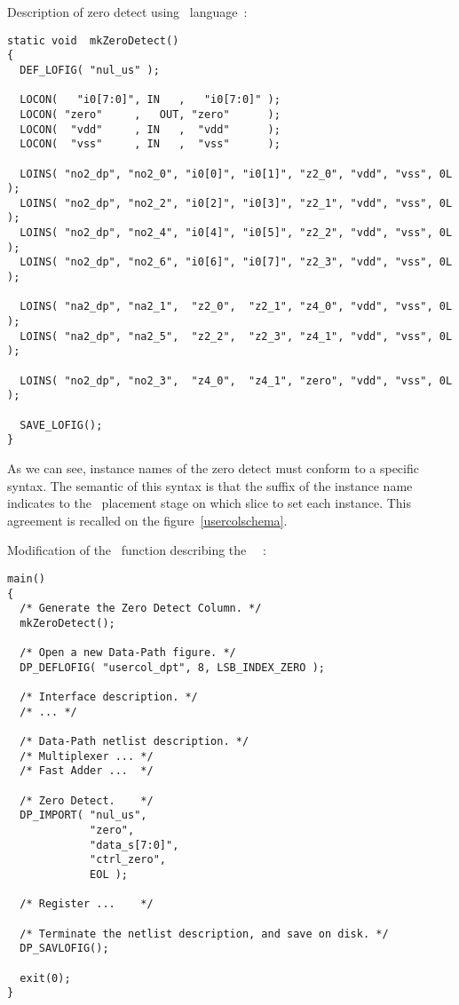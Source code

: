      \begin{description}
       \samepage
       \item
         Description of zero detect using \genlib\ language~:
         { \tt \begin{verbatim}
static void  mkZeroDetect()
{
  DEF_LOFIG( "nul_us" );

  LOCON(   "i0[7:0]", IN   ,   "i0[7:0]" );
  LOCON( "zero"     ,   OUT, "zero"      );
  LOCON(  "vdd"     , IN   ,  "vdd"      );
  LOCON(  "vss"     , IN   ,  "vss"      );

  LOINS( "no2_dp", "no2_0", "i0[0]", "i0[1]", "z2_0", "vdd", "vss", 0L );
  LOINS( "no2_dp", "no2_2", "i0[2]", "i0[3]", "z2_1", "vdd", "vss", 0L );
  LOINS( "no2_dp", "no2_4", "i0[4]", "i0[5]", "z2_2", "vdd", "vss", 0L );
  LOINS( "no2_dp", "no2_6", "i0[6]", "i0[7]", "z2_3", "vdd", "vss", 0L );

  LOINS( "na2_dp", "na2_1",  "z2_0",  "z2_1", "z4_0", "vdd", "vss", 0L );
  LOINS( "na2_dp", "na2_5",  "z2_2",  "z2_3", "z4_1", "vdd", "vss", 0L );

  LOINS( "no2_dp", "no2_3",  "z4_0",  "z4_1", "zero", "vdd", "vss", 0L );

  SAVE_LOFIG();
}
         \end{verbatim} \rm }
         \pagebreak[1]
         \forceindent
           As we can see, instance names of the zero detect must conform to
         a specific syntax. The semantic of this syntax is that the suffix
         of the instance name indicates to the \dpr\ placement stage on
         which slice to set each instance. This agreement is recalled on the
         figure~\ref{usercolschema}.
         \pagebreak[3]
       \item
         Modification of the \C\ function describing the \datapath\ \netlist~:
         { \tt \begin{verbatim}
main()
{
  /* Generate the Zero Detect Column. */
  mkZeroDetect();

  /* Open a new Data-Path figure. */
  DP_DEFLOFIG( "usercol_dpt", 8, LSB_INDEX_ZERO );

  /* Interface description. */
  /* ... */

  /* Data-Path netlist description. */ 
  /* Multiplexer ... */
  /* Fast Adder ...  */

  /* Zero Detect.    */
  DP_IMPORT( "nul_us",
             "zero",
             "data_s[7:0]",
             "ctrl_zero",
             EOL );

  /* Register ...    */

  /* Terminate the netlist description, and save on disk. */
  DP_SAVLOFIG();

  exit(0);
}
       \end{verbatim} \rm }
     \end{description}
